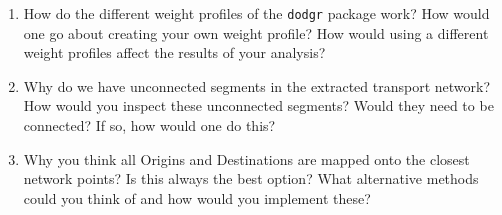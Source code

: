\documentclass[
  letterpaper,
  DIV=11,
  numbers=noendperiod]{scrreprt}
\providecommand{\tightlist}{%
  \setlength{\itemsep}{0pt}\setlength{\parskip}{0pt}}\usepackage{longtable,booktabs,array}
\begin{document}
\begin{enumerate}
\def\labelenumi{\arabic{enumi}.}
\tightlist
\item
  How do the different weight profiles of the \texttt{dodgr} package
  work? How would one go about creating your own weight profile? How
  would using a different weight profiles affect the results of your
  analysis?
\item
  Why do we have unconnected segments in the extracted transport
  network? How would you inspect these unconnected segments? Would they
  need to be connected? If so, how would one do this?
\item
  Why you think all Origins and Destinations are mapped onto the closest
  network points? Is this always the best option? What alternative
  methods could you think of and how would you implement these?
\end{enumerate}
\end{document}
